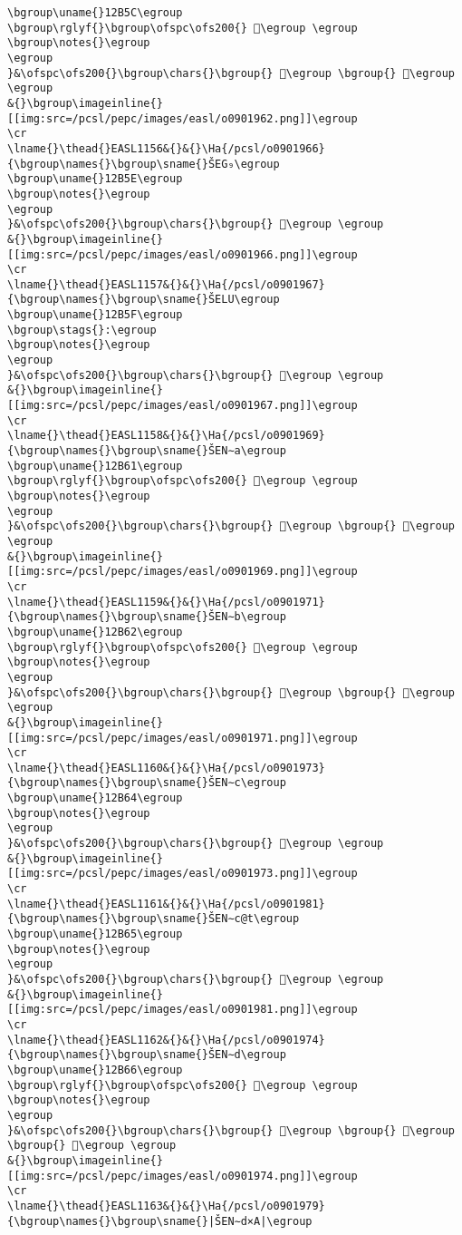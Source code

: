 \begin{verbatim}
\bgroup\uname{}12B5C\egroup
\bgroup\rglyf{}\bgroup\ofspc\ofs200{} 𒭜\egroup \egroup
\bgroup\notes{}\egroup
\egroup
}&\ofspc\ofs200{}\bgroup\chars{}\bgroup{} 𒭚\egroup \bgroup{} 𒭜\egroup \egroup
&{}\bgroup\imageinline{}[[img:src=/pcsl/pepc/images/easl/o0901962.png]]\egroup
\cr
\lname{}\thead{}EASL1156&{}&{}\Ha{/pcsl/o0901966}{\bgroup\names{}\bgroup\sname{}ŠEG₉\egroup
\bgroup\uname{}12B5E\egroup
\bgroup\notes{}\egroup
\egroup
}&\ofspc\ofs200{}\bgroup\chars{}\bgroup{} 𒭞\egroup \egroup
&{}\bgroup\imageinline{}[[img:src=/pcsl/pepc/images/easl/o0901966.png]]\egroup
\cr
\lname{}\thead{}EASL1157&{}&{}\Ha{/pcsl/o0901967}{\bgroup\names{}\bgroup\sname{}ŠELU\egroup
\bgroup\uname{}12B5F\egroup
\bgroup\stags{}:\egroup
\bgroup\notes{}\egroup
\egroup
}&\ofspc\ofs200{}\bgroup\chars{}\bgroup{} 𒭟\egroup \egroup
&{}\bgroup\imageinline{}[[img:src=/pcsl/pepc/images/easl/o0901967.png]]\egroup
\cr
\lname{}\thead{}EASL1158&{}&{}\Ha{/pcsl/o0901969}{\bgroup\names{}\bgroup\sname{}ŠEN∼a\egroup
\bgroup\uname{}12B61\egroup
\bgroup\rglyf{}\bgroup\ofspc\ofs200{} 𒭡\egroup \egroup
\bgroup\notes{}\egroup
\egroup
}&\ofspc\ofs200{}\bgroup\chars{}\bgroup{} 𒭠\egroup \bgroup{} 𒭡\egroup \egroup
&{}\bgroup\imageinline{}[[img:src=/pcsl/pepc/images/easl/o0901969.png]]\egroup
\cr
\lname{}\thead{}EASL1159&{}&{}\Ha{/pcsl/o0901971}{\bgroup\names{}\bgroup\sname{}ŠEN∼b\egroup
\bgroup\uname{}12B62\egroup
\bgroup\rglyf{}\bgroup\ofspc\ofs200{} 𒭢\egroup \egroup
\bgroup\notes{}\egroup
\egroup
}&\ofspc\ofs200{}\bgroup\chars{}\bgroup{} 𒭢\egroup \bgroup{} 𒭣\egroup \egroup
&{}\bgroup\imageinline{}[[img:src=/pcsl/pepc/images/easl/o0901971.png]]\egroup
\cr
\lname{}\thead{}EASL1160&{}&{}\Ha{/pcsl/o0901973}{\bgroup\names{}\bgroup\sname{}ŠEN∼c\egroup
\bgroup\uname{}12B64\egroup
\bgroup\notes{}\egroup
\egroup
}&\ofspc\ofs200{}\bgroup\chars{}\bgroup{} 𒭤\egroup \egroup
&{}\bgroup\imageinline{}[[img:src=/pcsl/pepc/images/easl/o0901973.png]]\egroup
\cr
\lname{}\thead{}EASL1161&{}&{}\Ha{/pcsl/o0901981}{\bgroup\names{}\bgroup\sname{}ŠEN∼c@t\egroup
\bgroup\uname{}12B65\egroup
\bgroup\notes{}\egroup
\egroup
}&\ofspc\ofs200{}\bgroup\chars{}\bgroup{} 𒭥\egroup \egroup
&{}\bgroup\imageinline{}[[img:src=/pcsl/pepc/images/easl/o0901981.png]]\egroup
\cr
\lname{}\thead{}EASL1162&{}&{}\Ha{/pcsl/o0901974}{\bgroup\names{}\bgroup\sname{}ŠEN∼d\egroup
\bgroup\uname{}12B66\egroup
\bgroup\rglyf{}\bgroup\ofspc\ofs200{} 𒭦\egroup \egroup
\bgroup\notes{}\egroup
\egroup
}&\ofspc\ofs200{}\bgroup\chars{}\bgroup{} 𒭦\egroup \bgroup{} 𒭨\egroup \bgroup{} 𒭩\egroup \egroup
&{}\bgroup\imageinline{}[[img:src=/pcsl/pepc/images/easl/o0901974.png]]\egroup
\cr
\lname{}\thead{}EASL1163&{}&{}\Ha{/pcsl/o0901979}{\bgroup\names{}\bgroup\sname{}|ŠEN∼d×A|\egroup

\end{verbatim}
